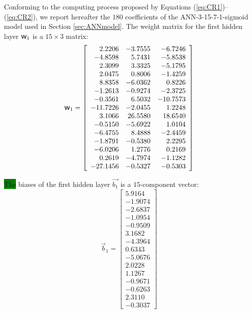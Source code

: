 \documentclass[metals,article,accept,pdftex,moreauthors]{Definitions/mdpi}
\DeclareRobustCommand{\w}{\mbox{\large\ensuremath{\mathsf{w}}}}
\newcommand{\hlok}[1]{\colorbox{green}{#1}}
\begin{document}
Conforming to the computing process proposed by Equations (\ref{eq:CR1})--(\ref{eq:CR2}), we report hereafter the $180$ coefficients of the ANN-3-15-7-1-sigmoid model used in Section \ref{sec:ANNmodel}.
The weight matrix for the first hidden layer $\w_1$ is a $15\times3$ matrix:
\begin{equation*}
\w_1 = \left[
\begin{array}{rrr}
2.2206 & -3.7555 & -6.7246 \\
-4.8598 & 5.7431 & -5.8538 \\
2.3099 & 3.3325 & -5.1795 \\
2.0475 & 0.8006 & -1.4259 \\
8.8358 & -6.0362 & 0.8226 \\
-1.2613 & -0.9274 & -2.3725 \\
-0.3561 & 6.5032 & -10.7573 \\
-11.7226 & -2.0455 & 1.2248 \\
3.1066 & 26.5580 & 18.6540 \\
-0.5150 & -5.6922 & 1.0104 \\
-6.4755 & 8.4888 & -2.4459 \\
-1.8791 & -0.5380 & 2.2295 \\
-6.0206 & 1.2776 & 0.2169 \\
0.2619 & -4.7974 & -1.1282 \\
-27.1456 & -0.5327 & -0.5303
\end{array}\right]
\end{equation*}

\hlok{The} %
 biases of the first hidden layer $\overrightarrow{b_1}$ is a $15$-component vector:
\begin{equation*}
\overrightarrow{b}_1 = \left[
\begin{array}{r}
5.9164 \\
-1.9074 \\
-2.6837 \\
-1.0954 \\
-0.9509 \\
3.1682 \\
-4.3964 \\
0.6343 \\
-5.0676 \\
2.0228 \\
1.1267 \\
-0.9671 \\
-0.6263 \\
2.3110 \\
-0.3037
\end{array}\right]
\end{equation*}
\end{document}
